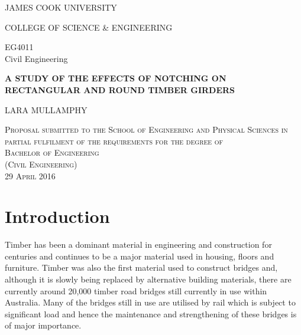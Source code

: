\documentclass[11pt,a4paper]{article}
\numberwithin{equation}{subsection}
\DeclareRobustCommand\nocite[1]{%
	{\def\cite##1{\ignorespaces}#1}}
\newcommand*{\titleGP}{\begingroup %
	\centering %
	\vspace*{\baselineskip} %
	
	
	{\Large JAMES COOK UNIVERSITY\\ [0.3\baselineskip] } %
	
	{\Huge COLLEGE OF SCIENCE \&{} ENGINEERING\\ [0.3\baselineskip] } %
	
	\vspace*{7\baselineskip} %
	
	{\Huge EG4011\\ Civil Engineering\\ [0.3\baselineskip] } %
	
	\vspace*{6\baselineskip} %
	
	{\Huge \bf{A STUDY OF THE EFFECTS OF NOTCHING ON RECTANGULAR AND ROUND TIMBER GIRDERS}\\ [0.3\baselineskip] } %
	
	\vspace*{2\baselineskip} %
	
	{\LARGE LARA MULLAMPHY\par} %

	
	\vfill %
	
	
		\scshape %
		Proposal submitted to the School of Engineering and Physical Sciences in partial fulfilment of the requirements for the degree of \\
		{\Large Bachelor of Engineering\\ (Civil Engineering)} %
		\\[\baselineskip] %
		29 April 2016\par %
	
	\endgroup}
\begin{document}
	\titleGP %

	
	\pagestyle{fancy}
	\fancyhead{}
	\fancyfoot{}
	\renewcommand{\headrulewidth}{0pt}
	\fancyfoot[R]{\thepage}
	\pagebreak



	\tableofcontents
	\vspace*{\baselineskip}
	\vspace*{\baselineskip}
	
	\pagebreak

	\nocite\listoffigures 
	\listoftables
	\pagebreak
	
	\section{Introduction}
	
	\setcounter{page}{1}

	
	\noindent
	Timber has been a dominant material in engineering and construction for centuries and continues to be a major material used in housing, floors and furniture. Timber was also the first material used to construct bridges and, although it is slowly being replaced by alternative building materials, there are currently around 20,000 timber road bridges still currently in use within Australia. Many of the bridges still in use are utilised by rail \cite{wilkinson_capacity_2008} which is subject to significant load and hence the maintenance and strengthening of these bridges is of major importance. 
    
    \vspace*{\baselineskip}
    
\end{document}
